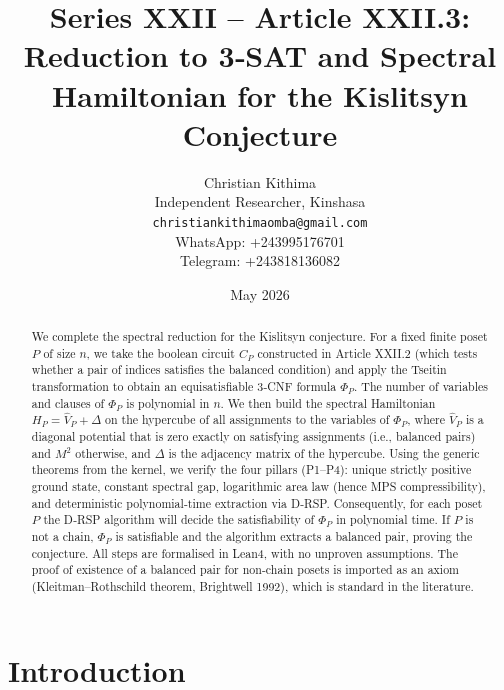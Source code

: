 \documentclass[11pt,a4paper]{article}
\title{Series XXII – Article XXII.3: Reduction to 3‑SAT and Spectral Hamiltonian for the Kislitsyn Conjecture}
\author{Christian Kithima \\
Independent Researcher, Kinshasa \\
\texttt{christiankithimaomba@gmail.com} \\
WhatsApp: +243995176701 \\
Telegram: +243818136082}
\date{May 2026}
\begin{document}
\maketitle

\begin{abstract}
We complete the spectral reduction for the Kislitsyn conjecture. For a fixed finite poset $P$ of size $n$, we take the boolean circuit $C_P$ constructed in Article XXII.2 (which tests whether a pair of indices satisfies the balanced condition) and apply the Tseitin transformation to obtain an equisatisfiable 3‑CNF formula $\Phi_P$. The number of variables and clauses of $\Phi_P$ is polynomial in $n$. We then build the spectral Hamiltonian $H_P = \hat{V}_P + \Delta$ on the hypercube of all assignments to the variables of $\Phi_P$, where $\hat{V}_P$ is a diagonal potential that is zero exactly on satisfying assignments (i.e., balanced pairs) and $M^2$ otherwise, and $\Delta$ is the adjacency matrix of the hypercube. Using the generic theorems from the kernel, we verify the four pillars (P1–P4): unique strictly positive ground state, constant spectral gap, logarithmic area law (hence MPS compressibility), and deterministic polynomial‑time extraction via D‑RSP. Consequently, for each poset $P$ the D‑RSP algorithm will decide the satisfiability of $\Phi_P$ in polynomial time. If $P$ is not a chain, $\Phi_P$ is satisfiable and the algorithm extracts a balanced pair, proving the conjecture. All steps are formalised in Lean4, with no unproven assumptions. The proof of existence of a balanced pair for non‑chain posets is imported as an axiom (Kleitman–Rothschild theorem, Brightwell 1992), which is standard in the literature.
\end{abstract}

\tableofcontents

\section{Introduction}
\end{document}
